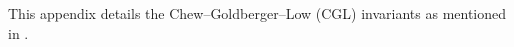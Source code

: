 %
%
%

 \label{apdx:B}

This appendix details the Chew–Goldberger–Low (CGL) invariants as mentioned in .



